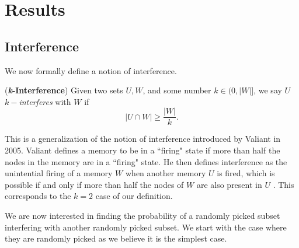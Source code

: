 \chapter{Results}

\section{Interference}

We now formally define a notion of interference. 

\begin{definition}
    (\textbf{\textit{k}-Interference}) Given two sets $U, W$, and some number $k \in (0,|W|]$, we say $U$ $k-$\textit{interferes} with $W$ if 
    \begin{equation}
        |U \cap W| \ge  \frac{|W|}{k}.
    \end{equation}
\end{definition}

This is a generalization of the notion of interference introduced by Valiant in 2005. Valiant defines a memory to be in a ``firing" state if more than half the nodes in the memory are in a ``firing" state. He then defines interference as the unintential firing of a memory $W$ when another memory $U$ is fired, which is possible if and only if more than half the nodes of $W$ are also present in $U$ \cite{valiant2005memorization}. This corresponds to the $k = 2$ case of our definition. 

We are now interested in finding the probability of a randomly picked subset interfering with another randomly picked subset. We start with the case where they are randomly picked as we believe it is the simplest case. 

